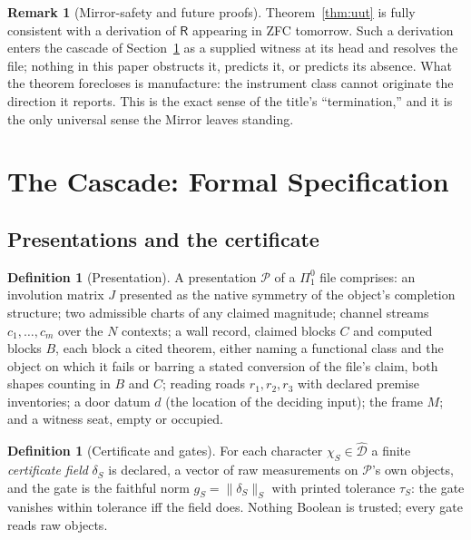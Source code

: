\documentclass[twocolumn,10pt]{article}
\theoremstyle{plain}
\theoremstyle{definition}
\newtheorem{definition}[theorem]{Definition}
\newtheorem{remark}[theorem]{Remark}
\newcommand{\R}{\mathsf{R}}
\begin{document}
\begin{remark}[Mirror-safety and future proofs]\label{rem:future}
Theorem~\ref{thm:uut} is fully consistent with a derivation of $\R$ appearing in ZFC tomorrow. Such a derivation enters the cascade of Section~\ref{sec:cascade} as a supplied witness at its head and resolves the file; nothing in this paper obstructs it, predicts it, or predicts its absence. What the theorem forecloses is manufacture: the instrument class cannot originate the direction it reports. This is the exact sense of the title's ``termination,'' and it is the only universal sense the Mirror leaves standing.
\end{remark}

\section{The Cascade: Formal Specification}\label{sec:cascade}

\subsection{Presentations and the certificate}
\begin{definition}[Presentation]\label{def:pres}
A presentation $\mathcal P$ of a $\Pi^0_1$ file comprises: an involution matrix $J$ presented as the native symmetry of the object's completion structure; two admissible charts of any claimed magnitude; channel streams $c_1,\dots,c_m$ over the $N$ contexts; a wall record, claimed blocks $C$ and computed blocks $B$, each block a cited theorem, either naming a functional class and the object on which it fails or barring a stated conversion of the file's claim, both shapes counting in $B$ and $C$; reading roads $r_1,r_2,r_3$ with declared premise inventories; a door datum $d$ (the location of the deciding input); the frame $M$; and a witness seat, empty or occupied.
\end{definition}

\begin{definition}[Certificate and gates]\label{def:cert}
For each character $\chi_S\in\widehat{\mathcal D}$ a finite \emph{certificate field} $\delta_S$ is declared, a vector of raw measurements on $\mathcal P$'s own objects, and the gate is the faithful norm $g_S=\lVert\delta_S\rVert_S$ with printed tolerance $\tau_S$: the gate vanishes within tolerance iff the field does. Nothing Boolean is trusted; every gate reads raw objects.
\end{definition}
\end{document}
